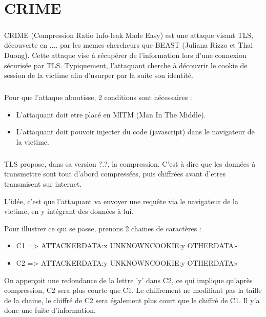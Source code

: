 \chapter{CRIME}
\label{chapter:crime}

\paragraph{}
CRIME (Compression Ratio Info-leak Made Easy) est une attaque visant TLS, découverte en .... par les memes chercheurs que BEAST (Juliana Rizzo et Thai Duong). Cette attaque vise à récupérer de l'information lors d'une connexion sécurisée par TLS. Typiquement, l'attaquant cherche à découvrir le cookie de session de la victime afin d'usurper par la suite son identité.

\paragraph{}
Pour que l'attaque aboutisse, 2 conditions sont nécessaires :
\begin{itemize}
  \item L'attaquant doit etre placé en MITM (Man In The Middle).
  \item L'attaquant doit pouvoir injecter du code (javascript) dans le navigateur de la victime.
\end{itemize}

\paragraph{}
TLS propose, dans sa version ?.?, la compression. C'est à dire que les données à transmettre sont tout d'abord compressées, puis chiffrées avant d'etres transmisent sur internet.

L'idée, c'est que l'attaquant va envoyer une requête via le navigateur de la victime, en y intégrant des données à lui.

Pour illustrer ce qui se passe, prenons 2 chaines de caractères :
\begin{itemize}
\item C1 => ATTACKERDATA:x UNKNOWNCOOKIE:y OTHERDATA»
\item C2 => ATTACKERDATA:y UNKNOWNCOOKIE:y OTHERDATA»
\end{itemize}
On apperçoit une redondance de la lettre 'y' dans C2, ce qui implique qu'après compression, C2 sera plus courte que C1. Le chiffrement ne modifiant pas la taille de la chaine, le chiffré de C2 sera également plus court que le chiffré de C1. Il y'a donc une fuite d'information.

